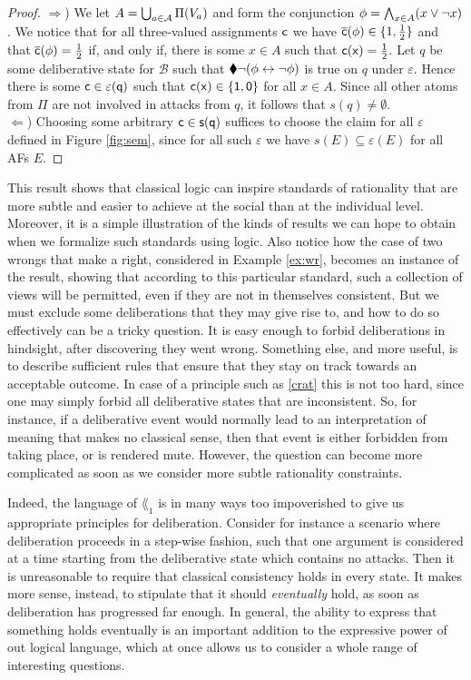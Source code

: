 \documentclass[greybox]{svmult}
\renewcommand{\bar}[1]{\overline{#1}}
\newcommand{\clab}{\sf c}
\newcommand{\views}{\mathcal B}
\newcommand{\sem}{\varepsilon}
\begin{document}
\begin{proof}
$\Rightarrow$) We let $A = \bigcup_{a \in \mathcal A}\Pi(V_a)$ and form the conjunction $\phi = \bigwedge_{x \in A}(x \lor \neg x)$. We notice that for all three-valued assignments $\clab$ we have $\bar \clab(\phi) \in \{1,\frac{1}{2}\}$ and that $\bar \clab(\phi) = \frac{1}{2}$ if, and only if, there is some $x \in A$ such that $\clab(x) = \frac{1}{2}$. Let $q$ be some deliberative state for $\views$ such that $\blacklozenge \neg (\phi \leftrightarrow \neg \phi)$ is true on 
$q$ under $\sem$. Hence there is some $\clab \in \sem(q)$ such that $\clab(x) \in \{1,0\}$ for all $x \in A$. Since all other atoms from $\Pi$ are not involved in attacks from $q$, it follows that $s(q) \not = \emptyset$. \\
$\Leftarrow$) Choosing some arbitrary $\clab \in s(q)$ suffices to choose the claim for all $\sem$ defined in Figure \ref{fig:sem}, since for all such $\sem$ we have $s(E) \subseteq \sem(E)$ for all AFs $E$.
\end{proof}

This result shows that classical logic can inspire standards of rationality that are more subtle and easier to achieve at the social than at the individual level. Moreover, it is a simple illustration of the kinds of results we can hope to obtain when we formalize such standards using logic. Also notice how the case of two wrongs that make a right, considered in Example \ref{ex:wr}, becomes an instance of the result, showing that according to this particular standard, such a collection of views will be permitted, even if they are not in themselves consistent. But we must exclude some deliberations that they may give rise to, and how to do so effectively can be a tricky question. It is easy enough to forbid deliberations in hindsight, after discovering they went wrong. Something else, and more useful, is to describe sufficient rules that ensure that they stay on track towards an acceptable outcome. In case of a principle such as \ref{crat} this is not too hard, since one may simply forbid all deliberative states that are inconsistent. So, for instance, if a deliberative event would normally lead to an interpretation of meaning that makes no classical sense, then that event is either forbidden from taking place, or is rendered mute. However, the question can become more complicated as soon as we consider more subtle rationality constraints.

Indeed, the language of $\lang_1$ is in many ways too impoverished to give us appropriate principles for deliberation. Consider for instance a scenario where deliberation proceeds in a step-wise fashion, such that one argument is considered at a time starting from the deliberative state which contains no attacks. Then it is unreasonable to require that classical consistency holds in every state. It makes more sense, instead, to stipulate that it should \emph{eventually} hold, as soon as deliberation has progressed far enough. In general, the ability to express that something holds eventually is an important addition to the expressive power of out logical language, which at once allows us to consider a whole range of interesting questions.
\end{document}
